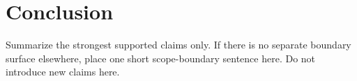 \section{Conclusion}

Summarize the strongest supported claims only. If there is no separate boundary surface elsewhere, place one short scope-boundary sentence here. Do not introduce new claims here.
